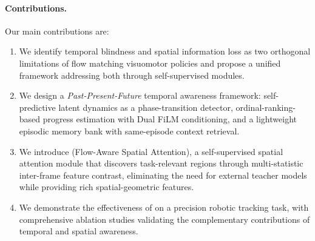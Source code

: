 \paragraph{Contributions.} Our main contributions are:
\begin{enumerate}[leftmargin=*,itemsep=2pt]
    \item We identify temporal blindness and spatial information loss as two orthogonal limitations of flow matching visuomotor policies and propose a unified framework addressing both through self-supervised modules.
    \item We design a \emph{Past-Present-Future} temporal awareness framework: self-predictive latent dynamics as a phase-transition detector, ordinal-ranking-based progress estimation with Dual FiLM conditioning, and a lightweight episodic memory bank with same-episode context retrieval.
    \item We introduce \fasa{} (Flow-Aware Spatial Attention), a self-supervised spatial attention module that discovers task-relevant regions through multi-statistic inter-frame feature contrast, eliminating the need for external teacher models while providing rich spatial-geometric features.
    \item We demonstrate the effectiveness of \method{} on a precision robotic tracking task, with comprehensive ablation studies validating the complementary contributions of temporal and spatial awareness.
\end{enumerate}
